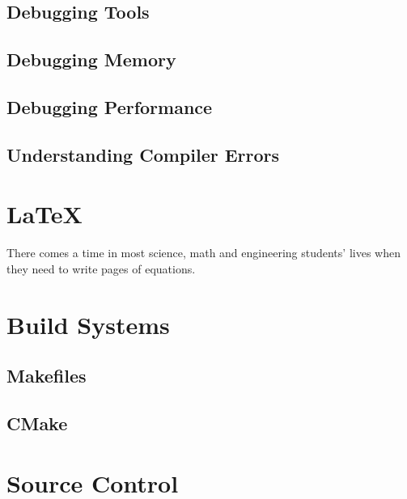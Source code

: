 \documentclass[12pt]{book}
\begin{document}
		\subsection{Debugging Tools}
		\subsection{Debugging Memory}
		\subsection{Debugging Performance}
		\subsection{Understanding Compiler Errors}
		
	\section{\LaTeX}
		There comes a time in most science, math and engineering students' lives when they need to write pages of equations.	
	
	\section{Build Systems}
		\subsection{Makefiles}
		\subsection{CMake}
		
	\section{Source Control}
\end{document}

